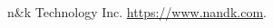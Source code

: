 {}
\begin{thebibliography}{99}

n\&k Technology Inc. \url{https://www.nandk.com}.

















\end{thebibliography}